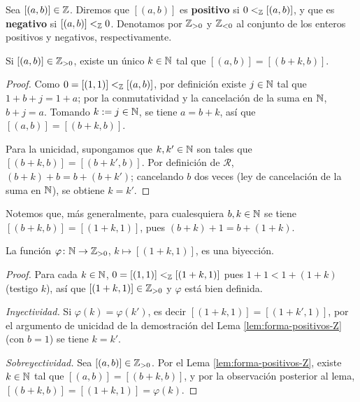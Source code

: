 \documentclass[12pt,a4paper]{book}
\begin{document}
    \begin{definicion}
        \label{def:positivo-negativo-Z}
        Sea $[(a,b)]\in\mathbb{Z}$. Diremos que $[(a,b)]$ es \textbf{positivo} si $0<_{\mathbb{Z}}[(a,b)]$, y que es \textbf{negativo} si $[(a,b)]<_{\mathbb{Z}}0$. Denotamos por $\mathbb{Z}_{>0}$ y $\mathbb{Z}_{<0}$ al conjunto de los enteros positivos y negativos, respectivamente.
    \end{definicion}

    \begin{lema}
        \label{lem:forma-positivos-Z}
        Si $[(a,b)]\in\mathbb{Z}_{>0}$, existe un único $k\in\mathbb{N}$ tal que $[(a,b)]=[(b+k,b)]$.
    \end{lema}
    \begin{proof}
        Como $0=[(1,1)]<_{\mathbb{Z}}[(a,b)]$, por definición existe $j\in\mathbb{N}$ tal que $1+b+j=1+a$; por la conmutatividad y la cancelación de la suma en $\mathbb{N}$, $b+j=a$. Tomando $k:=j\in\mathbb{N}$, se tiene $a=b+k$, así que $[(a,b)]=[(b+k,b)]$.

        Para la unicidad, supongamos que $k,k'\in\mathbb{N}$ son tales que $[(b+k,b)]=[(b+k',b)]$. Por definición de $\mathcal{R}$, $(b+k)+b=b+(b+k')$; cancelando $b$ dos veces (ley de cancelación de la suma en $\mathbb{N}$), se obtiene $k=k'$.
    \end{proof}

    Notemos que, más generalmente, para cualesquiera $b,k\in\mathbb{N}$ se tiene $[(b+k,b)]=[(1+k,1)]$, pues $(b+k)+1=b+(1+k)$.

    \begin{proposicion}
        \label{prop:biyeccion-positivos-Z}
        La función $\varphi\colon\mathbb{N}\to\mathbb{Z}_{>0}$, $k\mapsto[(1+k,1)]$, es una biyección.
    \end{proposicion}
    \begin{proof}
        Para cada $k\in\mathbb{N}$, $0=[(1,1)]<_{\mathbb{Z}}[(1+k,1)]$ pues $1+1<1+(1+k)$ (testigo $k$), así que $[(1+k,1)]\in\mathbb{Z}_{>0}$ y $\varphi$ está bien definida.

        \textit{Inyectividad.} Si $\varphi(k)=\varphi(k')$, es decir $[(1+k,1)]=[(1+k',1)]$, por el argumento de unicidad de la demostración del Lema \ref{lem:forma-positivos-Z} (con $b=1$) se tiene $k=k'$.

        \textit{Sobreyectividad.} Sea $[(a,b)]\in\mathbb{Z}_{>0}$. Por el Lema \ref{lem:forma-positivos-Z}, existe $k\in\mathbb{N}$ tal que $[(a,b)]=[(b+k,b)]$, y por la observación posterior al lema, $[(b+k,b)]=[(1+k,1)]=\varphi(k)$.
    \end{proof}
\end{document}

